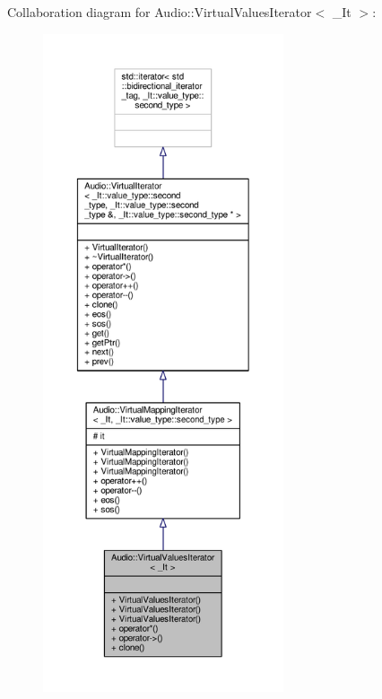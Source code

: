 Collaboration diagram for Audio\+:\+:Virtual\+Values\+Iterator$<$ \+\_\+\+It $>$\+:
\nopagebreak
\begin{figure}[H]
\begin{center}
\leavevmode
\includegraphics[height=550pt]{d1/d83/classAudio_1_1VirtualValuesIterator__coll__graph}
\end{center}
\end{figure}
